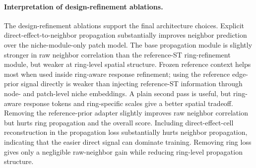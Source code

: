 \documentclass[sigconf,anonymous,review]{acmart}
\begin{document}
\paragraph{Interpretation of design-refinement ablations.}
The design-refinement ablations support the final architecture choices. Explicit direct-effect-to-neighbor propagation substantially improves neighbor prediction over the niche-module-only patch model. The base propagation module is slightly stronger in raw neighbor correlation than the reference-ST ring-refinement module, but weaker at ring-level spatial structure. Frozen reference context helps most when used inside ring-aware response refinement; using the reference edge-prior signal directly is weaker than injecting reference-ST information through node- and patch-level niche embeddings. A plain second pass is useful, but ring-aware response tokens and ring-specific scales give a better spatial tradeoff. Removing the reference-prior adapter slightly improves raw neighbor correlation but hurts ring propagation and the overall score. Including direct-effect-cell reconstruction in the propagation loss substantially hurts neighbor propagation, indicating that the easier direct signal can dominate training. Removing ring loss gives only a negligible raw-neighbor gain while reducing ring-level propagation structure.
\end{document}
